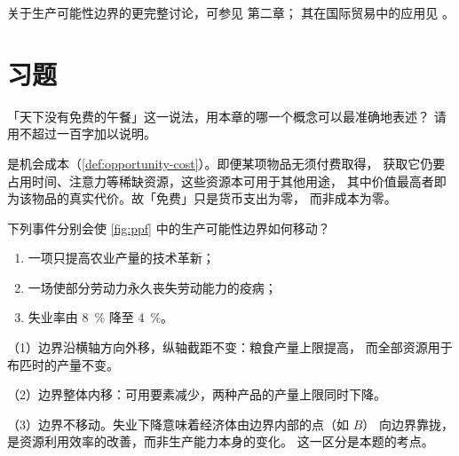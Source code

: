 关于生产可能性边界的更完整讨论，可参见 \textcite{mankiw2020} 第二章；
其在国际贸易中的应用见 \textcite{krugman2018}。

\section*{习题}

\begin{exercise}
  \label{exr:free-lunch}
  「天下没有免费的午餐」这一说法，用本章的哪一个概念可以最准确地表述？
  请用不超过一百字加以说明。
  \answerspace[2.5cm]
  \begin{solution}
    是机会成本（\cref{def:opportunity-cost}）。即便某项物品无须付费取得，
    获取它仍要占用时间、注意力等稀缺资源，这些资源本可用于其他用途，
    其中价值最高者即为该物品的真实代价。故「免费」只是货币支出为零，
    而非成本为零。
  \end{solution}
\end{exercise}

\begin{exercise}
  \label{exr:ppf-shift}
  下列事件分别会使 \cref{fig:ppf} 中的生产可能性边界如何移动？
  \begin{enumerate}[label=(\arabic*)]
    \item 一项只提高农业产量的技术革新；
    \item 一场使部分劳动力永久丧失劳动能力的疫病；
    \item 失业率由 \qty{8}{\percent} 降至 \qty{4}{\percent}。
  \end{enumerate}
  \answerspace[4cm]
  \begin{solution}
    （1）边界沿横轴方向外移，纵轴截距不变：粮食产量上限提高，
    而全部资源用于布匹时的产量不变。

    （2）边界整体内移：可用要素减少，两种产品的产量上限同时下降。

    （3）边界不移动。失业下降意味着经济体由边界内部的点（如 \(B\)）
    向边界靠拢，是资源利用效率的改善，而非生产能力本身的变化。
    这一区分是本题的考点。
  \end{solution}
\end{exercise}
